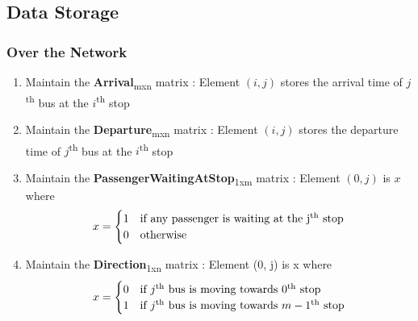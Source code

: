 \subsection{Data Storage}
\subsubsection{Over the Network}

\begin{enumerate}

\item Maintain the \textbf{Arrival}\textsubscript{mxn} matrix : Element $(i, j)$ stores the arrival time of $j$\textsuperscript{th} bus at the $i$\textsuperscript{th} stop
\item Maintain the \textbf{Departure}\textsubscript{mxn} matrix : Element $(i, j)$ stores the departure time of $j$\textsuperscript{th} bus at the $i$\textsuperscript{th} stop
\item Maintain the \textbf{PassengerWaitingAtStop}\textsubscript{1xm} matrix : Element $(0, j)$ is $x$ where
 \[ x = \begin{cases} \mbox{1} & \mbox{if any passenger is waiting at the j\textsuperscript{th} stop}  \\ \mbox{0} & \mbox{otherwise} \end{cases} \]
\item Maintain the \textbf{Direction}\textsubscript{1xn} matrix : Element (0, j) is x where
 \[ x = \begin{cases} \mbox{0} & \mbox{if $j$\textsuperscript{th} bus is moving towards $0$\textsuperscript{th} stop}  \\ \mbox{1} & \mbox{if $j$\textsuperscript{th} bus is moving towards $m-1$\textsuperscript{th} stop} \end{cases} \]


\end{enumerate}